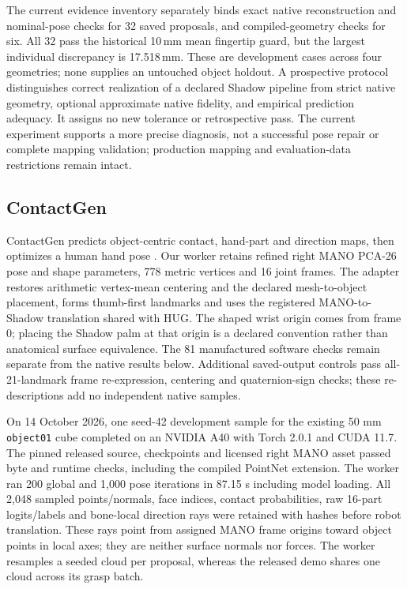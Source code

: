 \documentclass[10pt,letterpaper]{article}
\begin{document}
The current evidence inventory separately binds exact native reconstruction and
nominal-pose checks for 32 saved proposals, and compiled-geometry checks for six.
All 32 pass the historical 10\,mm mean fingertip guard, but the largest individual
discrepancy is 17.518\,mm. These are development cases across four geometries;
none supplies an untouched object holdout. A prospective protocol distinguishes
correct realization of a declared Shadow pipeline from strict native geometry,
optional approximate native fidelity, and empirical prediction adequacy. It
assigns no new tolerance or retrospective pass. The current experiment supports
a more precise diagnosis, not a successful pose repair or complete mapping
validation; production mapping and evaluation-data restrictions remain intact.


\subsection{ContactGen}
ContactGen predicts object-centric contact, hand-part and direction maps,
then optimizes a human hand pose \cite{contactgen}. Our worker retains refined
right MANO PCA-26 pose and shape parameters, 778 metric vertices and 16 joint
frames. The adapter restores arithmetic vertex-mean centering and the declared
mesh-to-object placement, forms thumb-first landmarks and uses the registered
MANO-to-Shadow translation shared with HUG. The shaped wrist origin comes from
frame 0; placing the Shadow palm at that origin is a declared convention rather
than anatomical surface equivalence. The 81 manufactured software checks remain
separate from the native results below. Additional saved-output controls pass
all-21-landmark frame re-expression, centering and quaternion-sign checks;
these re-descriptions add no independent native samples.

On 14 October 2026, one seed-42 development sample for the existing 50 mm
\texttt{object01} cube completed on an NVIDIA A40 with Torch 2.0.1 and CUDA 11.7.
The pinned released source, checkpoints and licensed right MANO asset passed
byte and runtime checks, including the compiled PointNet extension. The worker
ran 200 global and 1,000 pose iterations in 87.15 s including model loading.
All 2,048 sampled points/normals, face indices, contact probabilities, raw
16-part logits/labels and bone-local direction rays were retained with hashes
before robot translation. These rays point from assigned MANO frame origins
toward object points in local axes; they are neither surface normals nor forces.
The worker resamples a seeded cloud per proposal, whereas the released demo
shares one cloud across its grasp batch.
\end{document}
